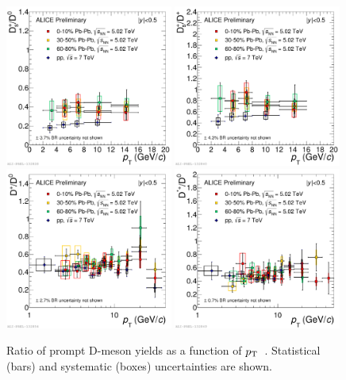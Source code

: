 \begin{figure}[!h]
 \begin{center}
\includegraphics[width=0.49\textwidth]{FigCap5/RatioDsD0-PbPb-010-3050-6080-502-pp-7.pdf}
\includegraphics[width=0.49\textwidth]{FigCap5/RatioDsDplus-PbPb-010-3050-6080-502-pp-7.pdf}
\includegraphics[width=0.49\textwidth]{FigCap5/RatioDplusDzero-PbPb-010-3050-6080-502-pp-7.pdf}
\includegraphics[width=0.49\textwidth]{FigCap5/RatioDstarDzero-PbPb-010-3050-6080-502-pp-7.pdf}
 \end{center}
 \caption{Ratio of prompt D-meson yields as a function of $p_{\rm T}$~\cite{ALICE-PUBLIC-2017-003}.
Statistical (bars) and systematic (boxes) uncertainties are shown.}
 \label{fig:DmesRatio} 
\end{figure} 

